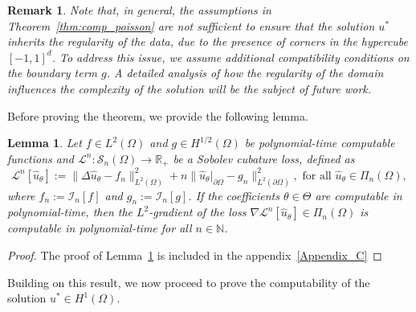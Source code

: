 \documentclass[pdflatex]{sn-jnl}%
\newtheorem{lemma}[theorem]{Lemma}
\newtheorem{remark}[theorem]{Remark}
\begin{document}
\begin{remark}
    Note that, in general, the assumptions in Theorem~\ref{thm:comp_poisson} are not sufficient to ensure that the solution $u^*$ inherits the regularity of the data, due to the presence of corners in the hypercube $[-1,1]^d$. To address this issue, we assume additional compatibility conditions \cite{Hell2014-wc} on the boundary term $g$. A detailed analysis of how the regularity of the domain influences the complexity of the solution will be the subject of future work.
\end{remark}
Before proving the theorem, we provide the following lemma.
\begin{lemma}\label{lemm:grad_SC}
Let $f\in L^2(\Omega)$ and $g\in H^{1/2}(\Omega)$ be polynomial-time computable functions and $\mathcal{L}^n:\mathcal{S}_n(\Omega) \rightarrow \mathbb{R}_+$ be a Sobolev cubature loss, defined as 
\begin{equation}\label{eq:sob_cubpoisson}
    \mathcal{L}^n[\hat{u}_\theta]:= \|\Delta \hat{u}_\theta-f_n\|_{L^2(\Omega)}^2 + n\| \hat{u}_\theta|_{\partial\Omega}-g_n\|_{L^2(\partial\Omega)}^2,\textrm{ for all } \hat{u}_\theta\in \Pi_n(\Omega),
\end{equation}
where $f_n:=\mathcal{I}_n[f]$ and $g_n:=\mathcal{I}_n[g]$. If the coefficients $\theta\in \Theta$ are computable in polynomial-time, then the $L^2$-gradient of the loss $\nabla\mathcal{L}^n[\hat{u}_\theta]\in \Pi_{n}(\Omega)$ is computable in polynomial-time for all $n\in \mathbb{N}$.
\end{lemma}
\begin{proof}
The proof of Lemma~\ref{lemm:grad_SC} is included in the appendix~\ref{Appendix_C}    
\end{proof}
Building on this result, we now proceed to prove the computability of the solution $u^*\in H^1(\Omega)$.
\end{document}

